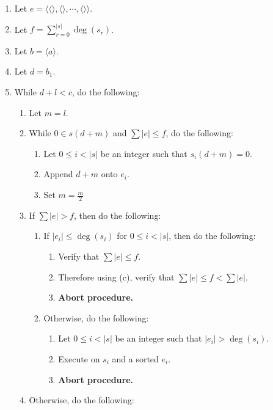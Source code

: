 \documentclass[twocolumn]{article}
\newcommand{\procedurehr}[2][]{\hyperref[sec:procedure #2]{\ifthenelse{\equal{#1}{}}{procedure #2}{#1}}}
\begin{document}
				\begin{enumerate}
					\item Let $e=\langle\langle\rangle,\langle\rangle,\cdots,\langle\rangle\rangle$.
					\item Let $f=\sum_{r=0}^{\lvert s\rvert}\deg(s_r)$.
					\item Let $b=\langle a\rangle$.
					\item Let $d=b_1$.
					\item While $d+l<c$, do the following:
					\begin{enumerate}
						\item Let $m=l$.
						\item While $0\in s(d+m)$ and $\sum\lvert e\rvert\le f$, do the following:
						\begin{enumerate}
							\item Let $0\le i<\lvert s\rvert$ be an integer such that $s_i(d+m)=0$.
							\item Append $d+m$ onto $e_i$.
							\item Set $m=\frac{m}{2}$
						\end{enumerate}
						\item If $\sum\lvert e\rvert>f$, then do the following:
						\begin{enumerate}
							\item If $\lvert e_i\rvert\le\deg(s_i)$ for $0\le i<\lvert s\rvert$, then do the following:
							\begin{enumerate}
								\item Verify that $\sum\lvert e\rvert\le f$.
								\item Therefore using (c), verify that $\sum\lvert e\rvert\le f<\sum\lvert e\rvert$.
								\item \textbf{Abort procedure.}
							\end{enumerate}
							\item Otherwise, do the following:
							\begin{enumerate}
								\item Let $0\le i<\lvert s\rvert$ be an integer such that $\lvert e_i\rvert>\deg(s_i)$.
								\item Execute \procedurehr{2.13} on $s_i$ and a sorted $e_i$.
								\item \textbf{Abort procedure.}
							\end{enumerate}
						\end{enumerate}
						\item Otherwise, do the following:
						\begin{enumerate}

\end{enumerate}
\end{enumerate}
\end{enumerate}
\end{document}
